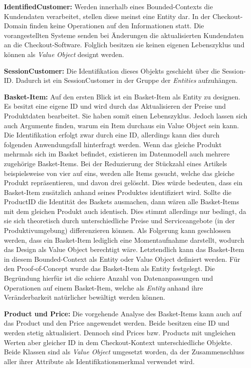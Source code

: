 \textbf{IdentifiedCustomer: } {Werden innerhalb eines Bounded-Contexts die Kundendaten verarbeitet, stellen diese meinst eine Entity dar. In der Checkout-Domain finden keine Operationen auf den Informationen statt. Die vorangestellten Systeme senden bei Änderungen die aktualisierten Kundendaten an die Checkout-Software. Folglich besitzen sie keinen eigenen Lebenszyklus und können als \emph{Value Object} designt werden.}

\textbf{SessionCustomer: } {Die Identifikation dieses Objekts geschieht über die Session-ID. Dadurch ist ein SessionCustomer in der Gruppe der \emph{Entities} aufzuhängen. }

\pagebreak

\textbf{Basket-Item: } {Auf den ersten Blick ist ein Basket-Item als Entity zu designen. Es besitzt eine eigene ID und wird durch das Aktualisieren der Preise und Produktdaten bearbeitet. Sie haben somit einen Lebenszyklus. Jedoch lassen sich auch Argumente finden, warum ein Item durchaus ein Value Object sein kann. Die Identifikation erfolgt zwar durch eine ID, allerdings kann dies durch folgenden Anwendungsfall hinterfragt werden. Wenn das gleiche Produkt mehrmals sich im Basket befindet, existieren im Datenmodell auch mehrere zugehörige Basket-Items. Bei der Reduzierung der Stückzahl eines Artikels beispielsweise von vier auf eins, werden alle Items gesucht, welche das gleiche Produkt repräsentieren, und davon drei gelöscht. Dies würde bedeuten, dass ein Basket-Item zusätzlich anhand seines Produktes identifiziert wird. Sollte die ProductID die Identität des Baskets ausmachen, dann wären alle Basket-Items mit dem gleichen Produkt auch identisch. Dies stimmt allerdings nur bedingt, da sie sich theoretisch durch unterschiedliche Preise und Serviceangebote (in der Produktivumgebung) differenzieren können. Als Folgerung kann geschlossen werden, dass ein Basket-Item lediglich eine Momentaufnahme darstellt, wodurch das Design als Value Object berechtigt wäre. Letztendlich kann das Basket-Item in diesem Bounded-Context als Entity oder Value Object definiert werden. Für den Proof-of-Concept wurde das Basket-Item als Entity festgelegt. Die Begründung hierfür ist die schiere Anzahl von Datenanpassungen und Operationen auf einem Basket-Item, welche als \emph{Entity} anhand ihre Veränderbarkeit natürlicher bewältigt werden können.}

\textbf{Product und Price: } {Die vorgehende Analyse des Basket-Items kann auch auf das Product und den Price angewendet werden. Beide besitzen eine ID und werden stetig aktualisiert. Dennoch sind Prices bzw. Products mit ungleichen Werten aber gleicher ID in dem Checkout-Kontext unterschiedliche Objekte. Beide Klassen sind als \emph{Value Object} umgesetzt worden, da der Zusammenschluss aller ihrer Attribute als Identifikationsmerkmal verwendet wird. }

